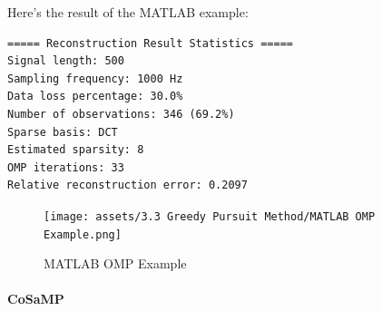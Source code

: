 \documentclass[12pt]{ctexart}
\begin{document}
Here's the result of the MATLAB example:

\begin{verbatim}
===== Reconstruction Result Statistics =====
Signal length: 500
Sampling frequency: 1000 Hz
Data loss percentage: 30.0%
Number of observations: 346 (69.2%)
Sparse basis: DCT
Estimated sparsity: 8
OMP iterations: 33
Relative reconstruction error: 0.2097
\end{verbatim}

\begin{figure}[H]
  \centering
  \texttt{[image: assets/3.3 Greedy Pursuit Method/MATLAB OMP
  Example.png]}
  \caption{MATLAB OMP Example}
\end{figure}

\newpage
\paragraph{\textbf{CoSaMP}}
\end{document}
